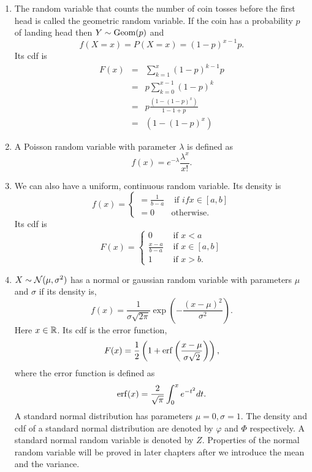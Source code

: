 \documentclass{article}
\begin{document}
\begin{enumerate}
\item The random variable that counts the number of coin tosses before the first
head is called the geometric random variable. If the coin has a probability $p$
of landing head then $Y \sim \text{Geom}(p)$ and
\begin{equation}\label{c2e7}
f(X=x) = P(X=x) = (1 - p)^{x-1}p.
\end{equation}
Its cdf is
\begin{eqnarray}
F(x) &=& \sum_{k=1}^x (1-p)^{k-1}p \nonumber \\
 &=& p\sum_{k=0}^{x-1}(1 - p)^k \nonumber \\
 &=& p\frac{(1 - (1 - p)^x)}{1 - 1 + p} \nonumber \\
 &=& (1 - (1 - p)^x) \label{c2e8}
\end{eqnarray}

\item A Poisson random variable with parameter $\lambda$ is defined as 
\begin{equation}\label{c2e9}
f(x) = e^{-\lambda}\frac{\lambda^x}{x!}.
\end{equation}

\item We can also have a uniform, continuous random variable. Its density is
\begin{equation}\label{c2e10}
f(x) = \begin{cases}
=\frac{1}{b - a} & \text{ if } if x \in [a, b] \\
= 0 & \text{otherwise}.
\end{cases}
\end{equation}
Its cdf is
\begin{equation}\label{c2e11}
F(x) = \begin{cases}
0 & \text{ if } x < a \\
\frac{x - a}{b - a} & \text{ if } x \in [a, b] \\
1 & \text{ if } x > b.
\end{cases}
\end{equation}

\item $X \sim \mathcal{N}(\mu, \sigma^2)$ has a normal or gaussian random variable with 
parameters $\mu$ and $\sigma$ if its density is,
\begin{equation}\label{c2e12}
f(x) = \frac{1}{\sigma\sqrt{2\pi}}\exp\left(-\frac{(x - \mu)^2}{\sigma^2}\right).
\end{equation}
Here $x \in \mathbb{R}$. Its cdf is the error function,
\begin{equation}\label{c2e13}
F(x) = \frac{1}{2}\left(1 + \operatorname{erf}\left(\frac{x - \mu}{\sigma\sqrt{2}}\right)\right),
\end{equation}
where the error function is defined as 
\begin{equation}\label{c2e14}
\operatorname{erf}(x) = \frac{2}{\sqrt{\pi}}\int_0^x e^{-t^2}dt.
\end{equation}
A standard normal distribution has parameters $\mu = 0, \sigma = 1$. The density 
and cdf of a standard normal distribution are denoted by $\varphi$ and $\Phi$ 
respectively. A standard normal random variable is denoted by $Z$. Properties of
the normal random variable will be proved in later chapters after we introduce the
mean and the variance.


\end{enumerate}
\end{document}
